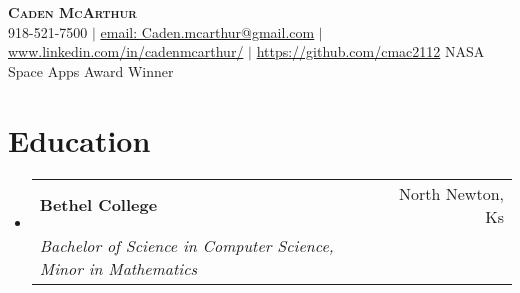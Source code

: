 \documentclass[letterpaper,11pt]{article}
\makeatletter
\newcommand{\resumeSubheading}[4]{
  \vspace{-2pt}\item
    \begin{tabular*}{0.97\textwidth}[t]{l@{\extracolsep{\fill}}r}
      \textbf{#1} & #2 \\
      \textit{\small#3} & \textit{\small #4} \\
    \end{tabular*}\vspace{-7pt}
}
\newcommand{\resumeSubHeadingListStart}{\begin{itemize}[leftmargin=0.15in, label={}]}
\newcommand{\resumeSubHeadingListEnd}{\end{itemize}}
\makeatother
\begin{document}

\begin{center}
    \textbf{\Huge \scshape Caden McArthur   } \\ \vspace{1pt}
    \small 918-521-7500 $|$ \href{mailto:x@x.com}{\underline{email: Caden.mcarthur@gmail.com}} $|$ 
    \underline{www.linkedin.com/in/cadenmcarthur/} $|$
    \underline{https://github.com/cmac2112} NASA Space Apps Award Winner
\end{center}


\section{Education}
  \resumeSubHeadingListStart
    \resumeSubheading
      {Bethel College}{North Newton, Ks}
      {Bachelor of Science in Computer Science, Minor in Mathematics}{}
      
  \resumeSubHeadingListEnd
\end{document}
